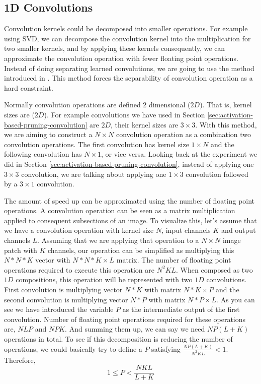 \subsection{1D Convolutions}
Convolution kernels could be decomposed into smaller operations. For example using SVD, we can decompose the convolution kernel into the multiplication for two smaller kernels, and by applying these kernels consequently, we can approximate the convolution operation with fewer floating point operations. Instead of doing separating learned convolutions, we are going to use the method introduced in \cite{alvarez2016decomposeme}. This method forces the separability of convolution operation as a hard constraint. 

Normally convolution operations are defined 2 dimensional ($2D$). That is, kernel sizes are ($2D$). For example convolutions we have used in Section \ref{sec:activation-based-pruning-convolution} are $2D$, their kernel sizes are $3 \times 3$. With this method, we are aiming to construct a $N \times N$ convolution operation as a combination two convolution operations. The first convolution has kernel size $1 \times N$ and the following convolution has $N \times 1$, or vice versa. Looking back at the experiment we did in  Section \ref{sec:activation-based-pruning-convolution}, instead of applying one $3 \times 3$ convolution, we are talking about applying one $1 \times 3$ convolution followed by a $3 \times 1$ convolution. 

The amount of speed up can be approximated using the number of floating point operations. A convolution operation can be seen as a matrix multiplication applied to consequent subsections of an image. To visualize this, let's assume that we have a convolution operation with kernel size $N$, input channels $K$ and output channels $L$. Assuming that we are applying that operation to a $N \times N$ image patch with $K$ channels, our operation can be simplified as multiplying this $N*N*K$ vector with $N*N*K \times L$ matrix. The number of floating point operations required to execute this operation are $N^2KL$. When composed as two $1D$ compositions, this operation will be represented with two $1D$ convolutions. First convolution is multiplying vector $N*K$ with matrix $N*K \times P$ and the second convolution is multiplying vector $N*P$ with matrix $N*P \times L$. As you can see we have introduced the variable $P$ as the intermediate output of the first convolution. Number of floating point operations required for these operations are, $NLP$ and $NPK$. And summing them up, we can say we need $NP(L + K)$ operations in total. To see if this decomposition is reducing the number of operations, we could basically try to define a $P$ satisfying $\frac{NP(L+K)}{N^2KL} < 1$. Therefore,
\begin{equation*}
1 \leq P < \frac{NKL}{L+K}
\end{equation*}


